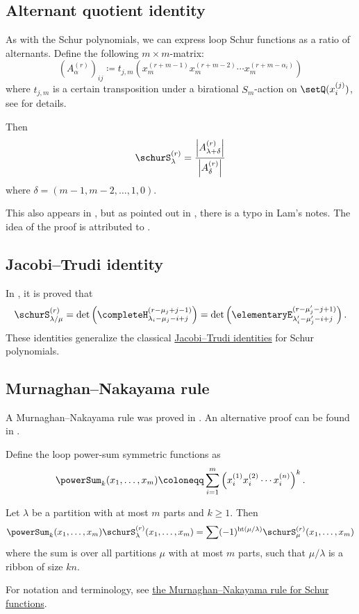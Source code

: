 \subsection[schurLoopWeylFormula]{Alternant quotient identity}

As with the Schur polynomials, we can express loop Schur functions
as a ratio of alternants. 
Define the following $m\times m$-matrix:
\[
(A_\alpha^{(r)})_{ij} \coloneqq t_{j,m} (x_m^{(r+m-1)} x_m^{(r+m-2)}
\dotsb x_m^{(r+m-\alpha_i)})
\]
where $t_{j,m}$ is a certain transposition under a birational $S_m$-action
on $\setQ( x_i^{(j)})$, see \cite{Frieden2020} for details.

Then
\[
\schurS^{(r)}_{\lambda} = \frac{\left| A_{\lambda+\delta}^{(r)}  \right|}{ \left| A_{\delta}^{(r)}  \right| }
\]
where $\delta = (m-1,m-2,\dotsc,1,0)$.

This also appears in \cite{Lam2010}, but as pointed out in 
\cite{Frieden2020}, there is a typo in Lam's notes.
The idea of the proof is attributed to .


\subsection[schurLoopJacobiTrudi]{Jacobi--Trudi identity}

In \cite{LamPylyavskyy2012}, it is proved that
\[
\schurS^{(r)}_{\lambda/\mu} = 
\det\left( \completeH_{\lambda_i - \mu_j - i+j}^{(r-\mu_j+j-1)} \right)
=
\det\left( \elementaryE_{\lambda'_i - \mu'_j - i+j}^{(r-\mu'_j-j+1)} \right).
\]
These identities generalize the classical 
\hyperref[schurJacobiTrudi]{Jacobi--Trudi identities}
for Schur polynomials.


\subsection[schurLoopMurnaghanNakayama]{Murnaghan--Nakayama rule}

A Murnaghan--Nakayama rule was proved in \cite{Ross2013}.
An alternative proof can be found in \cite{Frieden2020}.

Define the loop power-sum symmetric functions as
\[
\powerSum_k(x_1,\dotsc,x_m) \coloneqq \sum_{i=1}^m 
\left( x_i^{(1)}x_i^{(2)}\dotsb x_i^{(n)} \right)^k.
\]

\begin{theorem}
Let $\lambda$ be a partition with at most $m$ parts and $k\geq 1$.
Then
\[
\powerSum_k(x_1,\dotsc,x_m) \schurS^{(r)}_{\lambda}(x_1,\dotsc,x_m)
=
\sum (-1)^{\mathrm{ht}(\mu/\lambda)}
\schurS^{(r)}_{\mu}(x_1,\dotsc,x_m)
\]
where the sum is over all partitions $\mu$ with at most $m$
parts, such that $\mu/\lambda$ is a ribbon of size $kn$.
\end{theorem}
For notation and terminology, see 
\hyperref[schurMurnaghanNakayama]{the Murnaghan--Nakayama rule for Schur functions}.
